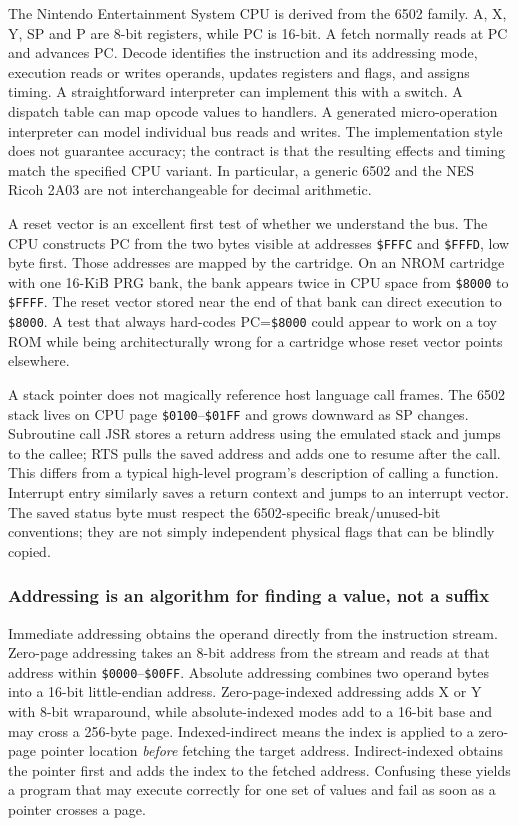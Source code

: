 The Nintendo Entertainment System CPU is derived from the 6502 family. A, X, Y, SP and P are 8-bit registers, while PC is 16-bit. A fetch normally reads at PC and advances PC. Decode identifies the instruction and its addressing mode, execution reads or writes operands, updates registers and flags, and assigns timing. A straightforward interpreter can implement this with a switch. A dispatch table can map opcode values to handlers. A generated micro-operation interpreter can model individual bus reads and writes. The implementation style does not guarantee accuracy; the contract is that the resulting effects and timing match the specified CPU variant. In particular, a generic 6502 and the NES Ricoh 2A03 are not interchangeable for decimal arithmetic.

A reset vector is an excellent first test of whether we understand the bus. The CPU constructs PC from the two bytes visible at addresses \texttt{\$FFFC} and \texttt{\$FFFD}, low byte first. Those addresses are mapped by the cartridge. On an NROM cartridge with one 16-KiB PRG bank, the bank appears twice in CPU space from \texttt{\$8000} to \texttt{\$FFFF}. The reset vector stored near the end of that bank can direct execution to \texttt{\$8000}. A test that always hard-codes PC=\texttt{\$8000} could appear to work on a toy ROM while being architecturally wrong for a cartridge whose reset vector points elsewhere.

A stack pointer does not magically reference host language call frames. The 6502 stack lives on CPU page \texttt{\$0100}--\texttt{\$01FF} and grows downward as SP changes. Subroutine call JSR stores a return address using the emulated stack and jumps to the callee; RTS pulls the saved address and adds one to resume after the call. This differs from a typical high-level program's description of calling a function. Interrupt entry similarly saves a return context and jumps to an interrupt vector. The saved status byte must respect the 6502-specific break/unused-bit conventions; they are not simply independent physical flags that can be blindly copied.

\subsubsection{Addressing is an algorithm for finding a value, not a suffix}\label{addressing-is-an-algorithm-for-finding-a-value-not-a-suffix}

Immediate addressing obtains the operand directly from the instruction stream. Zero-page addressing takes an 8-bit address from the stream and reads at that address within \texttt{\$0000}--\texttt{\$00FF}. Absolute addressing combines two operand bytes into a 16-bit little-endian address. Zero-page-indexed addressing adds X or Y with 8-bit wraparound, while absolute-indexed modes add to a 16-bit base and may cross a 256-byte page. Indexed-indirect means the index is applied to a zero-page pointer location \emph{before} fetching the target address. Indirect-indexed obtains the pointer first and adds the index to the fetched address. Confusing these yields a program that may execute correctly for one set of values and fail as soon as a pointer crosses a page.

